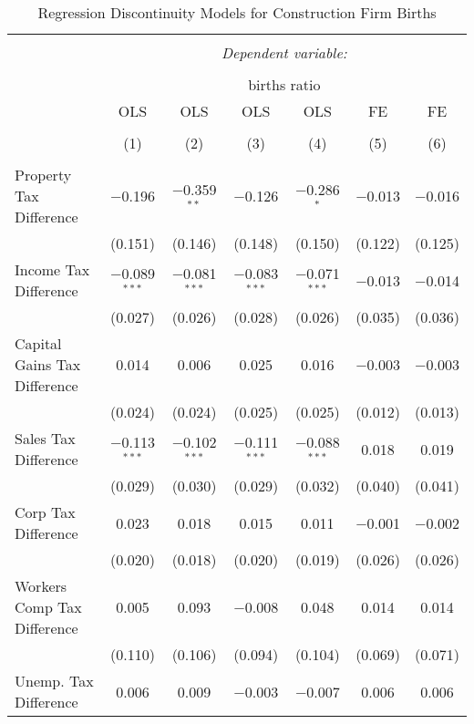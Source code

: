 
\begin{table}[!htbp] \centering 
  \caption{Regression Discontinuity Models for  Construction Firm Births} 
  \label{23rd} 
\footnotesize 
\begin{tabular}{@{\extracolsep{5pt}}lcccccc} 
\\[-1.8ex]\hline 
\hline \\[-1.8ex] 
 & \multicolumn{6}{c}{\textit{Dependent variable:}} \\ 
\cline{2-7} 
\\[-1.8ex] & \multicolumn{6}{c}{births ratio} \\ 
 & OLS & OLS & OLS & OLS & FE & FE \\ 
\\[-1.8ex] & (1) & (2) & (3) & (4) & (5) & (6)\\ 
\hline \\[-1.8ex] 
 Property Tax Difference & $-$0.196 & $-$0.359$^{**}$ & $-$0.126 & $-$0.286$^{*}$ & $-$0.013 & $-$0.016 \\ 
  & (0.151) & (0.146) & (0.148) & (0.150) & (0.122) & (0.125) \\ 
  Income Tax Difference & $-$0.089$^{***}$ & $-$0.081$^{***}$ & $-$0.083$^{***}$ & $-$0.071$^{***}$ & $-$0.013 & $-$0.014 \\ 
  & (0.027) & (0.026) & (0.028) & (0.026) & (0.035) & (0.036) \\ 
  Capital Gains Tax Difference & 0.014 & 0.006 & 0.025 & 0.016 & $-$0.003 & $-$0.003 \\ 
  & (0.024) & (0.024) & (0.025) & (0.025) & (0.012) & (0.013) \\ 
  Sales Tax Difference & $-$0.113$^{***}$ & $-$0.102$^{***}$ & $-$0.111$^{***}$ & $-$0.088$^{***}$ & 0.018 & 0.019 \\ 
  & (0.029) & (0.030) & (0.029) & (0.032) & (0.040) & (0.041) \\ 
  Corp Tax Difference & 0.023 & 0.018 & 0.015 & 0.011 & $-$0.001 & $-$0.002 \\ 
  & (0.020) & (0.018) & (0.020) & (0.019) & (0.026) & (0.026) \\ 
  Workers Comp Tax Difference & 0.005 & 0.093 & $-$0.008 & 0.048 & 0.014 & 0.014 \\ 
  & (0.110) & (0.106) & (0.094) & (0.104) & (0.069) & (0.071) \\ 
  Unemp. Tax Difference & 0.006 & 0.009 & $-$0.003 & $-$0.007 & 0.006 & 0.006 \\ 

\end{tabular}
\end{table}

